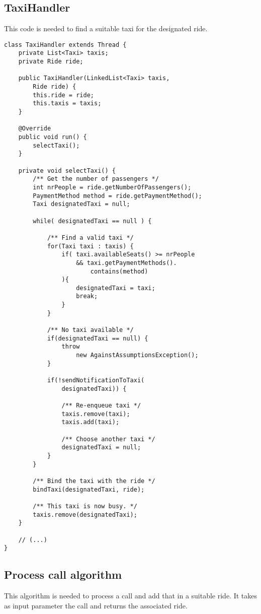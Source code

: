 \subsection{TaxiHandler}
This code is needed to find a suitable taxi for the designated ride.

\begin{lstlisting}[caption={TaxiHandler}]
class TaxiHandler extends Thread {
    private List<Taxi> taxis;
    private Ride ride;

    public TaxiHandler(LinkedList<Taxi> taxis, 
        Ride ride) {
        this.ride = ride;
        this.taxis = taxis;
    }

    @Override
    public void run() {
        selectTaxi();
    }

    private void selectTaxi() {
        /** Get the number of passengers */
        int nrPeople = ride.getNumberOfPassengers();
        PaymentMethod method = ride.getPaymentMethod();
        Taxi designatedTaxi = null;

        while( designatedTaxi == null ) {

            /** Find a valid taxi */
            for(Taxi taxi : taxis) {
                if( taxi.availableSeats() >= nrPeople 
                    && taxi.getPaymentMethods().
                        contains(method) 
                ){
                    designatedTaxi = taxi;
                    break;
                }
            }

            /** No taxi available */
            if(designatedTaxi == null) {
                throw 
                    new AgainstAssumptionsException();
            }

            if(!sendNotificationToTaxi(
                designatedTaxi)) {

                /** Re-enqueue taxi */
                taxis.remove(taxi);
                taxis.add(taxi);
                
                /** Choose another taxi */
                designatedTaxi = null;
            }
        }

        /** Bind the taxi with the ride */
        bindTaxi(designatedTaxi, ride);

        /** This taxi is now busy. */
        taxis.remove(designatedTaxi);
    }

    // (...)
}
\end{lstlisting}
\pagebreak


\subsection{Process call algorithm}
This algorithm is needed to process a call and add that in a suitable ride.
It takes as input parameter the call and returns the associated ride.

